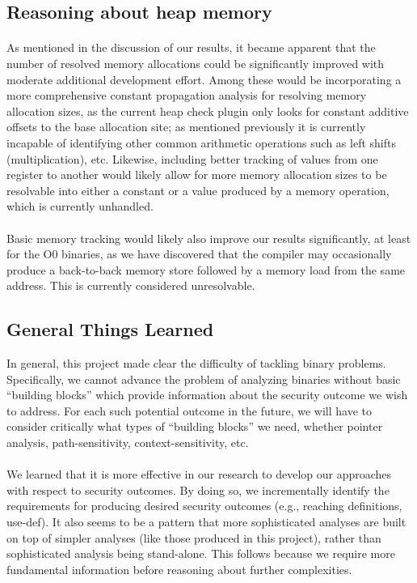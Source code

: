 \documentclass[letterpaper,11pt]{article}
\begin{document}
\subsection{Reasoning about heap memory}

\paragraph{}
As mentioned in the discussion of our results, it became apparent that the
number of resolved memory allocations could be significantly improved with
moderate additional development effort. Among these would be incorporating a
more comprehensive constant propagation analysis for resolving memory
allocation sizes, as the current heap check plugin only looks for constant
additive offsets to the base allocation site; as mentioned previously it is
currently incapable of identifying other common arithmetic operations such as
left shifts (multiplication), etc. Likewise, including better tracking of
values from one register to another would likely allow for more memory
allocation sizes to be resolvable into either a constant or a value produced by
a memory operation, which is currently unhandled.

\paragraph{}
Basic memory tracking would likely also improve our results significantly, at
least for the O0 binaries, as we have discovered that the compiler may
occasionally produce a back-to-back memory store followed by a memory load from
the same address. This is currently considered unresolvable.

\subsection{General Things Learned}

In general, this project made clear the difficulty of tackling binary
problems. Specifically, we cannot advance the problem of analyzing binaries
without basic ``building blocks'' which provide information about the security
outcome we wish to address. For each such potential outcome in the future,
we will have to consider critically what types of ``building blocks'' we need,
whether pointer analysis, path-sensitivity, context-sensitivity, etc.

\paragraph{}
We learned that it is more effective in our research to develop our approaches
with respect to security outcomes. By doing so, we incrementally identify the
requirements for producing desired security outcomes (e.g., reaching
definitions, use-def). It also seems to be a pattern that more sophisticated
analyses are built on top of simpler analyses (like those produced in this
project), rather than sophisticated analysis being stand-alone. This follows
because we require more fundamental information before reasoning about
further complexities.
\end{document}
